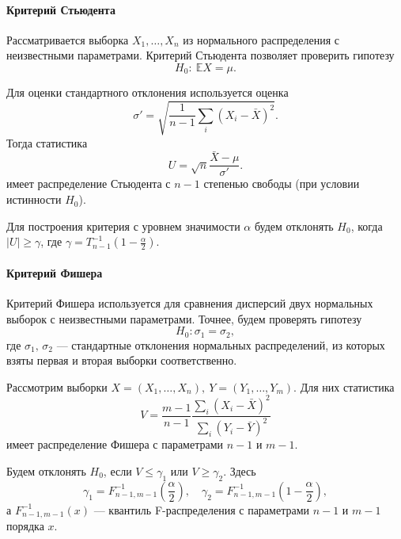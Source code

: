 \documentclass[16pt]{article}
\begin{document}
\paragraph{Критерий Стьюдента}
Рассматривается выборка $X_1, \ldots, X_n$ из нормального распределения с неизвестными параметрами. Критерий Стьюдента позволяет проверить гипотезу
$$H_0\colon\ \mathbb{E}X = \mu.$$

Для оценки стандартного отклонения используется оценка
$$\sigma' = \sqrt{\dfrac{1}{n-1}\sum_i(X_i - \bar X)^2}.$$
Тогда статистика
$$U = \sqrt{n}\frac{\bar X - \mu}{\sigma'}.$$
имеет распределение Стьюдента с $n - 1$ степенью свободы (при условии истинности $H_0$).

Для построения критерия с уровнем значимости $\alpha$ будем отклонять $H_0$,
когда $|U| \geq \gamma$, где $\gamma = T_{n - 1}^{-1}\left(1 - \frac{\alpha}{2}\right).$

\paragraph{Критерий Фишера}
Критерий Фишера используется для сравнения дисперсий двух нормальных выборок с неизвестными параметрами. Точнее, будем проверять гипотезу
$$H_0\colon \sigma_1 = \sigma_2,$$
где $\sigma_1, \, \sigma_2$ --- стандартные отклонения нормальных распределений, из которых взяты первая и вторая выборки соответственно.

Рассмотрим выборки $X = (X_1, \ldots, X_n), \ Y = (Y_1, \ldots, Y_m)$. Для них статистика
$$ V = \dfrac{m-1}{n-1}\dfrac{\sum_i(X_i - \bar X)^2}{\sum_i(Y_i - \bar Y)^2}$$ 
имеет распределение Фишера с параметрами $n - 1$ и $m - 1$.

Будем отклонять $H_0$, если $V \leq \gamma_1$ или $V \geq \gamma_2$. Здесь
$$\gamma_1 = F_{n-1, m-1}^{-1}\left(\frac{\alpha}{2}\right), \quad
\gamma_2 = F_{n-1, m-1}^{-1}\left(1 - \frac{\alpha}{2}\right),$$  а $F_{n-1, m-1}^{-1}(x)$ --- квантиль F-распределения с параметрами $n - 1$ и $m - 1$ порядка $x$.
\end{document}
